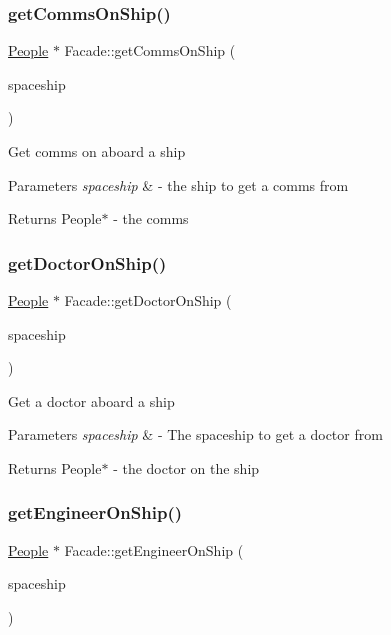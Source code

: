 \subsubsection{\texorpdfstring{get\+Comms\+On\+Ship()}{getCommsOnShip()}}
{\footnotesize\ttfamily \hyperlink{classPeople}{People} $\ast$ Facade\+::get\+Comms\+On\+Ship (\begin{DoxyParamCaption}\item[{\hyperlink{classSpaceship}{Spaceship} $\ast$}]{spaceship }\end{DoxyParamCaption})}

Get comms on aboard a ship 
\begin{DoxyParams}{Parameters}
{\em spaceship} & -\/ the ship to get a comms from \\
\hline
\end{DoxyParams}
\begin{DoxyReturn}{Returns}
People$\ast$ -\/ the comms 
\end{DoxyReturn}
\mbox{\label{classFacade_addc3c5f6eee5a886287af62c910546e0}} 
\subsubsection{\texorpdfstring{get\+Doctor\+On\+Ship()}{getDoctorOnShip()}}
{\footnotesize\ttfamily \hyperlink{classPeople}{People} $\ast$ Facade\+::get\+Doctor\+On\+Ship (\begin{DoxyParamCaption}\item[{\hyperlink{classSpaceship}{Spaceship} $\ast$}]{spaceship }\end{DoxyParamCaption})}

Get a doctor aboard a ship 
\begin{DoxyParams}{Parameters}
{\em spaceship} & -\/ The spaceship to get a doctor from \\
\hline
\end{DoxyParams}
\begin{DoxyReturn}{Returns}
People$\ast$ -\/ the doctor on the ship 
\end{DoxyReturn}
\mbox{\label{classFacade_a63631cca1ed46f8adb96083a72c169ca}} 
\subsubsection{\texorpdfstring{get\+Engineer\+On\+Ship()}{getEngineerOnShip()}}
{\footnotesize\ttfamily \hyperlink{classPeople}{People} $\ast$ Facade\+::get\+Engineer\+On\+Ship (\begin{DoxyParamCaption}\item[{\hyperlink{classSpaceship}{Spaceship} $\ast$}]{spaceship }\end{DoxyParamCaption})}

